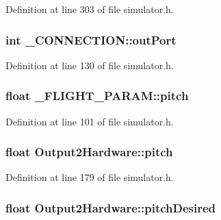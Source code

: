 \-Definition at line 303 of file simulator.\-h.

\hypertarget{group___h_i_t_l_plugin_gaaba6cf28320e1105f7320ea8a21df15b}{
\subsubsection[{out\-Port}]{\setlength{\rightskip}{0pt plus 5cm}int {\bf \-\_\-\-C\-O\-N\-N\-E\-C\-T\-I\-O\-N\-::out\-Port}}}\label{group___h_i_t_l_plugin_gaaba6cf28320e1105f7320ea8a21df15b}


\-Definition at line 130 of file simulator.\-h.

\hypertarget{group___h_i_t_l_plugin_gaff7712b3622dba7f5178549057fdac4e}{
\subsubsection[{pitch}]{\setlength{\rightskip}{0pt plus 5cm}float {\bf \-\_\-\-F\-L\-I\-G\-H\-T\-\_\-\-P\-A\-R\-A\-M\-::pitch}}}\label{group___h_i_t_l_plugin_gaff7712b3622dba7f5178549057fdac4e}


\-Definition at line 101 of file simulator.\-h.

\hypertarget{group___h_i_t_l_plugin_gaf92e2c90046782813af0a2fdd6e48bf4}{
\subsubsection[{pitch}]{\setlength{\rightskip}{0pt plus 5cm}float {\bf \-Output2\-Hardware\-::pitch}}}\label{group___h_i_t_l_plugin_gaf92e2c90046782813af0a2fdd6e48bf4}


\-Definition at line 179 of file simulator.\-h.

\hypertarget{group___h_i_t_l_plugin_ga29bbb9f720db0b7039f92a3afcb785a3}{
\subsubsection[{pitch\-Desired}]{\setlength{\rightskip}{0pt plus 5cm}float {\bf \-Output2\-Hardware\-::pitch\-Desired}}}\label{group___h_i_t_l_plugin_ga29bbb9f720db0b7039f92a3afcb785a3}


